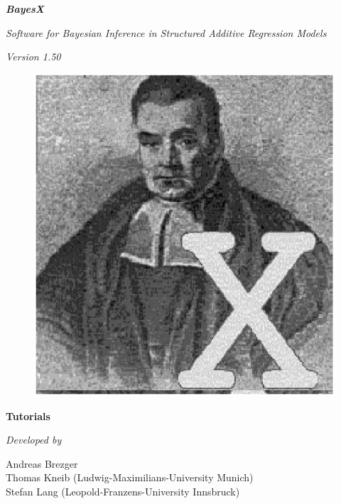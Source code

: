 \documentclass[11pt,a4paper,twoside]{bayesxreport}
\begin{document}
\MakeShortVerb{\#}

\thispagestyle{empty}

\begin{center}
{\bf \em \huge BayesX}

\vspace{0.5cm}

{\em \large Software for Bayesian Inference in Structured Additive
Regression Models}

\vspace{0.5cm}

{\em Version 1.50}

\vspace{0.5cm}

\begin{figure}[h]
\begin{center}
\includegraphics[scale=1.2]{grafiken/bayesicon.eps}
\end{center}
\end{figure}

\vfill

{\bf\sffamily \huge Tutorials}

\vfill

\end{center}

{\em Developed by}

Andreas Brezger\\
Thomas Kneib (Ludwig-Maximilians-University Munich)\\
Stefan Lang (Leopold-Franzens-University Innsbruck)\\
\end{document}
